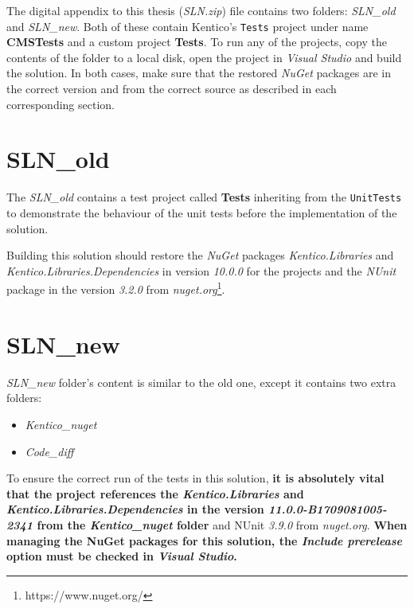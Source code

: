\documentclass[
  print,
  table,
  nolof,
  nolot,
  nocover,
  oneside
]{fithesis3}
\begin{document}
The digital appendix to this thesis (\textit{SLN.zip}) file contains two folders: \textit{SLN\_old} and \textit{SLN\_new}. Both of these contain Kentico's \texttt{Tests} project under name \textbf{CMSTests} and a custom project \textbf{Tests}. To run any of the projects, copy the contents of the folder to a local disk, open the project in \textit{Visual Studio} and build the solution. In both cases, make sure that the restored \textit{NuGet} packages are in the correct version and from the correct source as described in each corresponding section.

\section{SLN\_old}
\label{slnold}

The \textit{SLN\_old} contains a test project called \textbf{Tests} inheriting from the \texttt{UnitTests} to demonstrate the behaviour of the unit tests before the implementation of the solution.

Building this solution should restore the \textit{NuGet} packages \textit{Kentico.Libraries} and \textit{Kentico.Libraries.Dependencies} in version \textit{10.0.0} for the projects and the \textit{NUnit} package in the version \textit{3.2.0} from \textit{nuget.org}\footnote{https://www.nuget.org/}.


\section{SLN\_new}
\label{slnnew}

\textit{SLN\_new} folder's content is similar to the old one, except it contains two extra folders:
\begin{itemize}
    \item \textit{Kentico\_nuget}
    \item \textit{Code\_diff}
\end{itemize}

To ensure the correct run of the tests in this solution, \textbf{it is absolutely vital that the project references the \textit{Kentico.Libraries} and \textit{Kentico.Libraries.Dependencies} in the version \textit{11.0.0-B1709081005-2341} from the \textit{Kentico\_nuget} folder} and NUnit \textit{3.9.0} from \textit{nuget.org}. \textbf{When managing the NuGet packages for this solution, the \textit{Include prerelease} option must be checked in \textit{Visual Studio}.}
\end{document}
